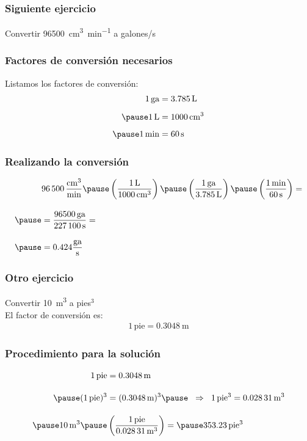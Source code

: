 \documentclass[14pt]{beamer}
\begin{document}
\begin{frame}
\frametitle{Siguiente ejercicio}
Convertir \SI{96500}{\cubic\centi\meter\per\minute} a  galones/s
\end{frame}
\begin{frame}
\frametitle{Factores de conversión necesarios}
Listamos los factores de conversión:
\pause
\begin{eqnarray*}
\begin{aligned}
1 \, \text{ga} &= \SI{3.785}{\liter} \\[0.5em] \pause
\SI{1}{\liter} &= \SI{1000}{\cubic\centi\meter} \\[0.5em] \pause
\SI{1}{\minute} &= \SI{60}{\second}
\end{aligned}
\end{eqnarray*}
\end{frame}
\begin{frame}
\frametitle{Realizando la conversión}
\begin{eqnarray*}
\begin{aligned}
&\SI[per-mode=fraction]{96500}{\cubic\centi\meter\per\minute} \pause  \left( \dfrac{\SI{1}{\liter}}{\SI{1000}{\cubic\centi\meter}} \right) \pause \left( \dfrac{1 \, \text{ga}}{\SI{3.785}{\liter}} \right) \pause \left(  \dfrac{\SI{1}{\minute}}{\SI{60}{\second}} \right) = \\[1em] \pause
&= \dfrac{96500 \, \text{ga}}{\SI{227100}{\second}} = \\[1em] \pause
&= 0.424 \dfrac{\text{ga}}{\unit{\second}}
\end{aligned}
\end{eqnarray*}
\end{frame}
\begin{frame}
\frametitle{Otro ejercicio}
Convertir \SI{10}{\cubic\meter} a pies${}^{3}$
\\
\bigskip
\pause
El factor de conversión es:
\begin{align*}
1 \, \text{pie} = \SI{0.3048}{\meter}
\end{align*}
\end{frame}
\begin{frame}
\frametitle{Procedimiento para la solución}
\begin{eqnarray*}
\begin{aligned}
1 \, \text{pie} &= \SI{0.3048}{\meter} \\[1em] \pause
(1 \, \text{pie})^{3} &= (\SI{0.3048}{\meter})^{3} \pause \hspace{0.2cm} \Rightarrow \hspace{0.2cm} 1 \, \text{pie}^{3} = \SI{0.02831}{\cubic\meter} \\[1em] \pause
\SI{10}{\cubic\meter} \pause &\left( \dfrac{1 \, \text{pie}}{\SI{0.02831}{\cubic\meter}} \right) = \pause 353.23 \, \text{pie}^{3}
\end{aligned}
\end{eqnarray*}
\end{frame}
\end{document}
